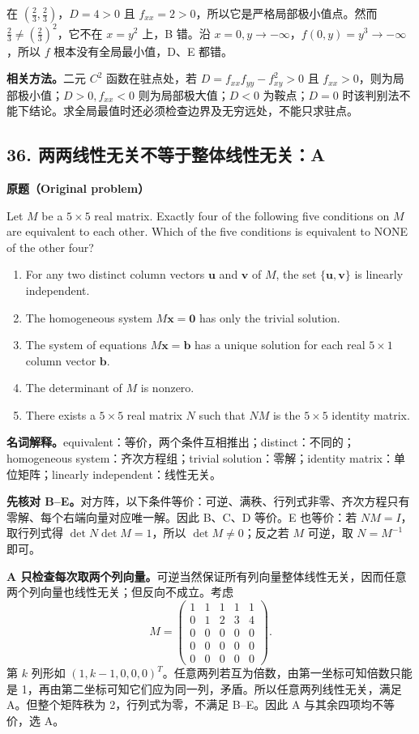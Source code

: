 \documentclass[11pt,a4paper,fontset=fandol]{ctexart}
\begin{document}
在 $(\frac23,\frac23)$，$D=4>0$ 且 $f_{xx}=2>0$，所以它是严格局部极小值点。然而 $\frac23\ne(\frac23)^2$，它不在 $x=y^2$ 上，B 错。沿 $x=0,y\to-\infty$，$f(0,y)=y^3\to-\infty$，所以 $f$ 根本没有全局最小值，D、E 都错。

\textbf{相关方法。}二元 $C^2$ 函数在驻点处，若 $D=f_{xx}f_{yy}-f_{xy}^2>0$ 且 $f_{xx}>0$，则为局部极小值；$D>0,f_{xx}<0$ 则为局部极大值；$D<0$ 为鞍点；$D=0$ 时该判别法不能下结论。求全局最值时还必须检查边界及无穷远处，不能只求驻点。

\subsection{36. 两两线性无关不等于整体线性无关：A}
\label{p2:q36}
\textbf{原题（Original problem）}

Let $M$ be a $5\times5$ real matrix. Exactly four of the following five conditions on $M$ are equivalent to each other. Which of the five conditions is equivalent to NONE of the other four?
\begin{enumerate}[label=(\Alph*)]
\item For any two distinct column vectors $\mathbf u$ and $\mathbf v$ of $M$, the set $\{\mathbf u,\mathbf v\}$ is linearly independent.
\item The homogeneous system $M\mathbf x=\mathbf0$ has only the trivial solution.
\item The system of equations $M\mathbf x=\mathbf b$ has a unique solution for each real $5\times1$ column vector $\mathbf b$.
\item The determinant of $M$ is nonzero.
\item There exists a $5\times5$ real matrix $N$ such that $NM$ is the $5\times5$ identity matrix.
\end{enumerate}
\textbf{名词解释。}equivalent：等价，两个条件互相推出；distinct：不同的；homogeneous system：齐次方程组；trivial solution：零解；identity matrix：单位矩阵；linearly independent：线性无关。

\textbf{先核对 B--E。}对方阵，以下条件等价：可逆、满秩、行列式非零、齐次方程只有零解、每个右端向量对应唯一解。因此 B、C、D 等价。E 也等价：若 $NM=I$，取行列式得 $\det N\det M=1$，所以 $\det M\ne0$；反之若 $M$ 可逆，取 $N=M^{-1}$ 即可。

\textbf{A 只检查每次取两个列向量。}可逆当然保证所有列向量整体线性无关，因而任意两个列向量也线性无关；但反向不成立。考虑
\[
M=\begin{pmatrix}
1&1&1&1&1\\
0&1&2&3&4\\
0&0&0&0&0\\
0&0&0&0&0\\
0&0&0&0&0
\end{pmatrix}.
\]
第 $k$ 列形如 $(1,k-1,0,0,0)^T$。任意两列若互为倍数，由第一坐标可知倍数只能是 1，再由第二坐标可知它们应为同一列，矛盾。所以任意两列线性无关，满足 A。但整个矩阵秩为 2，行列式为零，不满足 B--E。因此 A 与其余四项均不等价，选 A。
\end{document}
